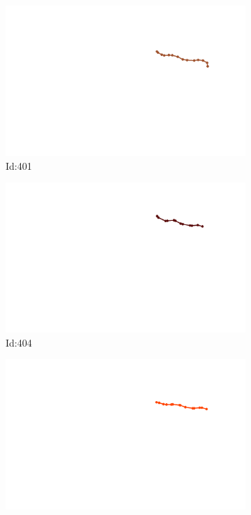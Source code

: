 \documentclass[12pt,twoside]{report}
\begin{document}
\begin{figure}
\begin{subfigure}[b]{0.20\textwidth}
\centering
\includegraphics[width=\textwidth]{../trajectories/401.png}
\caption{Id:401}
\end{subfigure}
\begin{subfigure}[b]{0.20\textwidth}
\centering
\includegraphics[width=\textwidth]{../trajectories/404.png}
\caption{Id:404}
\end{subfigure}
\begin{subfigure}[b]{0.20\textwidth}
\centering
\includegraphics[width=\textwidth]{../trajectories/405.png}

\end{subfigure}
\end{figure}
\end{document}
